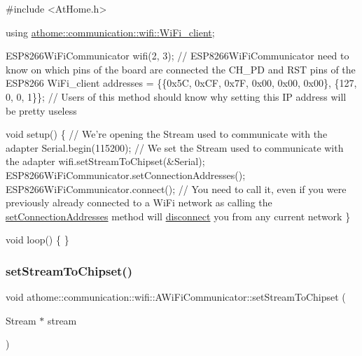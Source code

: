 \begin{DoxyCode}
\textcolor{preprocessor}{#include <AtHome.h>}

\textcolor{keyword}{using} \mbox{\hyperlink{structathome_1_1communication_1_1wifi_1_1s__wifi__client}{athome::communication::wifi::WiFi\_client}};

ESP8266WiFiCommunicator wifi(2, 3); \textcolor{comment}{// ESP8266WiFiCommunicator need to know}
on which pins of the board are connected the CH\_PD and RST pins of the
ESP8266 WiFi\_client addresses = \{\{0x5C, 0xCF, 0x7F, 0x00, 0x00, 0x00\},
\{127, 0, 0, 1\}\}; \textcolor{comment}{// Users of this method should know why setting this IP}
address will be pretty useless

\textcolor{keywordtype}{void} setup() \{
  \textcolor{comment}{// We're opening the Stream used to communicate with the adapter}
  Serial.begin(115200);
  \textcolor{comment}{// We set the Stream used to communicate with the adapter}
  wifi.setStreamToChipset(&Serial);
  ESP8266WiFiCommunicator.setConnectionAddresses();
  ESP8266WiFiCommunicator.connect(); \textcolor{comment}{// You need to call it, even if you}
were previously already connected to a WiFi network as calling the
\mbox{\hyperlink{classathome_1_1communication_1_1wifi_1_1_a_wi_fi_communicator_a31fb91672f298718d99bb9776dfe46c9}{setConnectionAddresses}} method will \mbox{\hyperlink{classathome_1_1communication_1_1wifi_1_1_a_wi_fi_communicator_a6131240ac0daa0f9fb4d46871feea4c2}{disconnect}} you from any current network
\}

\textcolor{keywordtype}{void} loop() \{
\}
\end{DoxyCode}
 \mbox{\label{classathome_1_1communication_1_1wifi_1_1_a_wi_fi_communicator_a42f2ad88713db57bd9e9670f090924de}} 
\subsubsection{\texorpdfstring{set\+Stream\+To\+Chipset()}{setStreamToChipset()}}
{\footnotesize\ttfamily void athome\+::communication\+::wifi\+::\+A\+Wi\+Fi\+Communicator\+::set\+Stream\+To\+Chipset (\begin{DoxyParamCaption}\item[{Stream $\ast$}]{stream }\end{DoxyParamCaption})}


